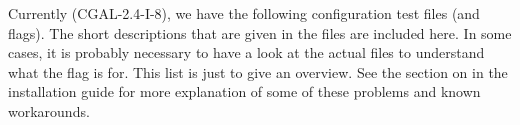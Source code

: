 
\noindent Currently (CGAL-2.4-I-8), we have the following configuration
test files (and flags). The short descriptions that are given in the files are 
included here. In some cases, it is probably necessary to have a look at the
actual files to understand what the flag is for. This list is just to
give an overview.  See the section on
 in the installation guide
for more explanation of some of these problems and known workarounds. 

